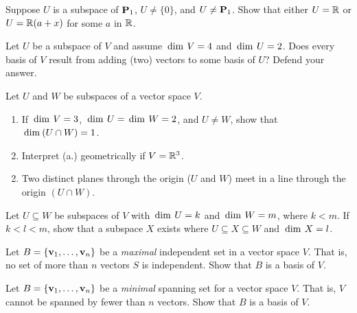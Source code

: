 \begin{multicols}{2}
\begin{ex}
Suppose $U$ is a subspace of $\textbf{P}_{1}$, \newline $U \neq \{0\}$, and $U \neq \textbf{P}_{1}$. Show that either $U = \mathbb{R}$ or $U = \mathbb{R}(a + x)$ for some $a$ in $\mathbb{R}$.
\end{ex}

\begin{ex}
Let $U$ be a subspace of $V$ and assume $\thinspace\operatorname{dim\medspace} V = 4$ and $\thinspace\operatorname{dim\medspace} U = 2$. Does every basis of $V$ result from adding (two) vectors to some basis of $U$? Defend your answer.
\end{ex}

\begin{ex}
Let $U$ and $W$ be subspaces of a vector space $V$.

\begin{enumerate}[label={\alph*.}]
\item If $\thinspace\operatorname{dim\medspace} V = 3$, $\thinspace\operatorname{dim\medspace} U = \thinspace\operatorname{dim\medspace} W = 2$, and $U \neq W$, show that $\thinspace\operatorname{dim\medspace}(U \cap W) = 1$.

\item Interpret (a.) geometrically if $V = \mathbb{R}^3$.

\end{enumerate}
\begin{sol}
\begin{enumerate}[label={\alph*.}]
\setcounter{enumi}{1}
\item  Two distinct planes through the origin ($U$ and $W$) meet in a line through the origin $(U \cap W)$.

\end{enumerate}
\end{sol}
\end{ex}

\begin{ex}
Let $U \subseteq W$ be subspaces of $V$ with $\thinspace\operatorname{dim\medspace} U = k$ and $\thinspace\operatorname{dim\medspace} W = m$, where $k < m$. If $k < l < m$, show that a subspace $X$ exists where $U \subseteq X \subseteq W$ and $\thinspace\operatorname{dim\medspace} X = l$.
\end{ex}

\begin{ex}
Let $B = \{\textbf{v}_{1}, \dots, \textbf{v}_{n}\}$ be a \textit{maximal} independent set in a vector space $V$. That is, no set of more than $n$ vectors $S$ is independent. Show that $B$ is a basis of $V$.
\end{ex}

\begin{ex}
Let $B = \{\textbf{v}_{1}, \dots, \textbf{v}_{n}\}$ be a \textit{minimal} spanning set for a vector space $V$. That is, $V$ cannot be spanned by fewer than $n$ vectors. Show that $B$ is a basis of $V$.
\end{ex}


\end{multicols}
